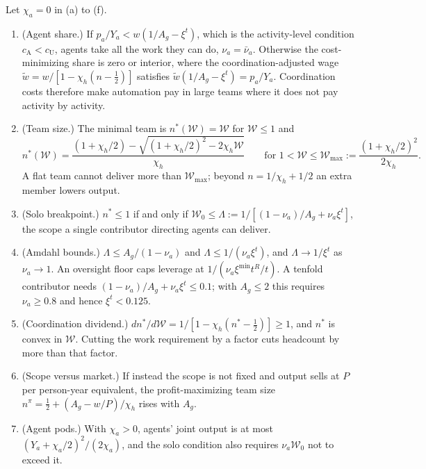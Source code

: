 \begin{proposition}\label{prop:ext-team}
Let $\chi_a=0$ in (a) to (f).
\begin{enumerate}
\item[(a)] (Agent share.) If $p_a/Y_a<w(1/A_g-\xi^t)$, which is the activity-level condition $c_{\mathrm A}<c_{\mathrm U}$, agents take all the work they can do, $\nu_a=\bar\nu_a$. Otherwise the cost-minimizing share is zero or interior, where the coordination-adjusted wage $\tilde w=w/[1-\chi_h(n-\tfrac12)]$ satisfies $\tilde w(1/A_g-\xi^t)=p_a/Y_a$. Coordination costs therefore make automation pay in large teams where it does not pay activity by activity.
\item[(b)] (Team size.) The minimal team is $n^*(\mathcal W)=\mathcal W$ for $\mathcal W\le1$ and
\begin{equation}\label{eq:ext-nstar}
n^*(\mathcal W)=\frac{(1+\chi_h/2)-\sqrt{(1+\chi_h/2)^2-2\chi_h\mathcal W}}{\chi_h}\qquad\text{for }1<\mathcal W\le \mathcal W_{\max}:=\frac{(1+\chi_h/2)^2}{2\chi_h}.
\end{equation}
A flat team cannot deliver more than $\mathcal W_{\max}$; beyond $n=1/\chi_h+1/2$ an extra member lowers output.
\item[(c)] (Solo breakpoint.) $n^*\le1$ if and only if $\mathcal W_0\le\Lambda:=1/[(1-\nu_a)/A_g+\nu_a\xi^t]$, the scope a single contributor directing agents can deliver.
\item[(d)] (Amdahl bounds.) $\Lambda\le A_g/(1-\nu_a)$ and $\Lambda\le1/(\nu_a\xi^t)$, and $\Lambda\to1/\xi^t$ as $\nu_a\to1$. An oversight floor caps leverage at $1/(\nu_a\xi^{\min}t^R/t)$. A tenfold contributor needs $(1-\nu_a)/A_g+\nu_a\xi^t\le0.1$; with $A_g\le2$ this requires $\nu_a\ge0.8$ and hence $\xi^t<0.125$.
\item[(e)] (Coordination dividend.) $dn^*/d\mathcal W=1/[1-\chi_h(n^*-\tfrac12)]\ge1$, and $n^*$ is convex in $\mathcal W$. Cutting the work requirement by a factor cuts headcount by more than that factor.
\item[(f)] (Scope versus market.) If instead the scope is not fixed and output sells at $P$ per person-year equivalent, the profit-maximizing team size $n^\pi=\tfrac12+(A_g-w/P)/\chi_h$ rises with $A_g$.
\item[(g)] (Agent pods.) With $\chi_a>0$, agents' joint output is at most $(Y_a+\chi_a/2)^2/(2\chi_a)$, and the solo condition also requires $\nu_a\mathcal W_0$ not to exceed it.
\end{enumerate}
\end{proposition}


